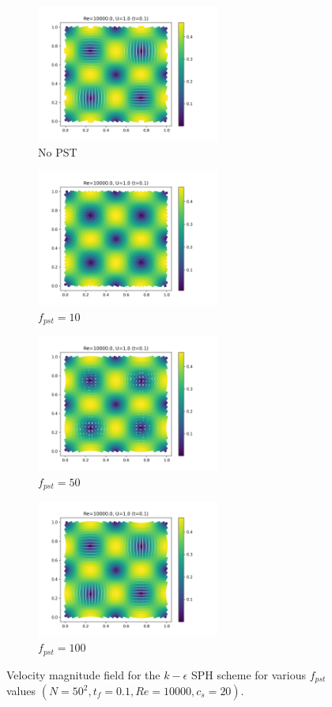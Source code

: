 \begin{figure}[htbp!]
  \begin{subfigure}{7cm}
    \centering\includegraphics[width=6cm]{Code-Figures/keps/pst/c0_20_tait_pec_dtmul_1_nx_50_pst_-1_re_10000_k_eps/final_vmag.png}
    \caption{No PST}
  \end{subfigure}
  \begin{subfigure}{7cm}
    \centering\includegraphics[width=6cm]{Code-Figures/keps/pst/c0_20_tait_pec_dtmul_1_nx_50_pst_10_re_10000_k_eps/final_vmag.png}
    \caption{$f_{pst} = 10$}
  \end{subfigure}
  \begin{subfigure}{7cm}
    \centering\includegraphics[width=6cm]{Code-Figures/keps/pst/c0_20_tait_pec_dtmul_1_nx_50_pst_50_re_10000_k_eps/final_vmag.png}
    \caption{$f_{pst} = 50$}
  \end{subfigure}
  \begin{subfigure}{7cm}
    \centering\includegraphics[width=6cm]{Code-Figures/keps/pst/c0_20_tait_pec_dtmul_1_nx_50_pst_100_re_10000_k_eps/final_vmag.png}
    \caption{$f_{pst} = 100$}
  \end{subfigure}
  \caption{Velocity magnitude field for the $k-\epsilon$ SPH scheme for various $f_{pst}$ values $(N=50^2, t_f=0.1, Re=10000, c_s=20)$.}
  \label{fig:keps-pst-vmag}
\end{figure}

